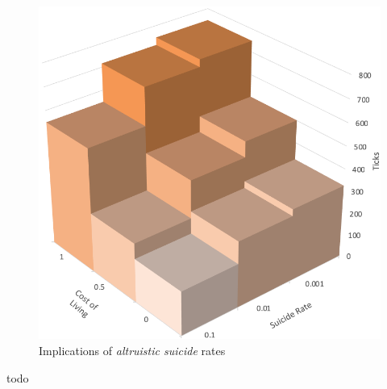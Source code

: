 \documentclass[a4paper,12pt,twocolumn]{article}
\begin{document}
\begin{figure}[!htbp]
\centering
\includegraphics[scale=0.6]{figures/3d_histogram.png}
\caption{Implications of \textit{altruistic suicide} rates}
\label{fig:3d-histogram} 
\end{figure}

\begin{flushleft}
todo
\end{flushleft}

\end{document}
